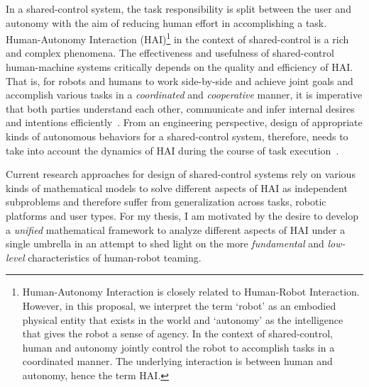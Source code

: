 \documentclass[12pt]{article}
\begin{document}
In a shared-control system, the task responsibility is split between the user and autonomy with the aim of reducing human effort in accomplishing a task. Human-Autonomy Interaction (HAI)\footnote{Human-Autonomy Interaction is closely related to Human-Robot Interaction. However, in this proposal, we interpret the term `robot' as an embodied physical entity that exists in the world and `autonomy' as the intelligence that gives the robot a sense of agency. In the context of shared-control, human and autonomy jointly control the robot to accomplish tasks in a coordinated manner. The underlying interaction is between human and autonomy, hence the term HAI.} in the context of shared-control is a rich and complex phenomena. The effectiveness and usefulness of shared-control human-machine systems critically depends on the quality and efficiency of HAI. That is, for robots and humans to work side-by-side and achieve joint goals and accomplish various tasks in a \textit{coordinated} and \textit{cooperative} manner, it is imperative that both parties understand each other, communicate and infer internal desires and intentions efficiently~\cite{hoc2001towards}. From an engineering perspective, design of appropriate kinds of autonomous behaviors for a shared-control system, therefore, needs to take into account the dynamics of HAI during the course of task execution~\cite{hoffman2007cost}. 

Current research approaches for design of shared-control systems rely on various kinds of mathematical models to solve different aspects of HAI as independent subproblems and therefore suffer from generalization across tasks, robotic platforms and user types. For my thesis, I am motivated by the desire to develop a \textit{unified} mathematical framework to analyze different aspects of HAI under a single umbrella in an attempt to shed light on the more \textit{fundamental} and \textit{low-level} characteristics of human-robot teaming.
\end{document}

